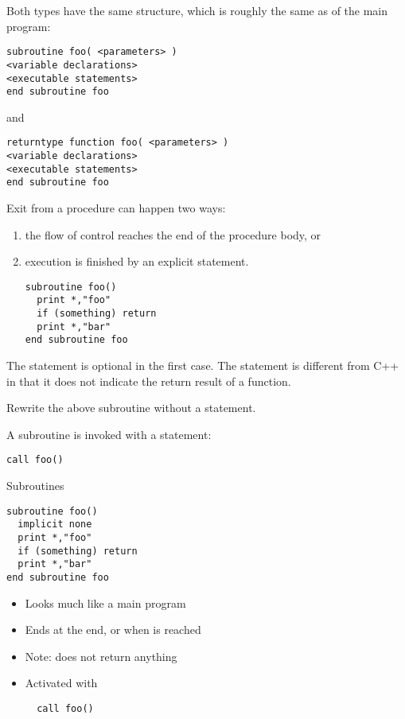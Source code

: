 Both types have the same structure, which is roughly the same as of
the main program:
\begin{lstlisting}
subroutine foo( <parameters> )
<variable declarations>
<executable statements>
end subroutine foo
\end{lstlisting}
and
\begin{lstlisting}
returntype function foo( <parameters> )
<variable declarations>
<executable statements>
end subroutine foo
\end{lstlisting}

Exit from a procedure can happen two ways:
\begin{enumerate}
\item the flow of control reaches the end of the procedure body, or
\item execution is finished by an explicit 
  statement.
\begin{lstlisting}
subroutine foo()
  print *,"foo"
  if (something) return
  print *,"bar"
end subroutine foo
\end{lstlisting}
\end{enumerate}
The  statement is optional in the first case.
The  statement is different from C++ in that it does not
indicate the return result of a function.

\begin{exercise}
  Rewrite the above subroutine  without a  statement.
\end{exercise}

A subroutine is invoked with a  statement:
\begin{lstlisting}
call foo()
\end{lstlisting}

\begin{slide}{Subroutines}
  \label{sl:subroutine}
\begin{lstlisting}
subroutine foo()
  implicit none
  print *,"foo"
  if (something) return
  print *,"bar"
end subroutine foo
\end{lstlisting}
\begin{itemize}
\item Looks much like a main program
\item Ends at the end, or when  is reached
\item Note:  does not return anything
\item Activated with 
\begin{lstlisting}
  call foo()
\end{lstlisting}
\end{itemize}
\end{slide}

